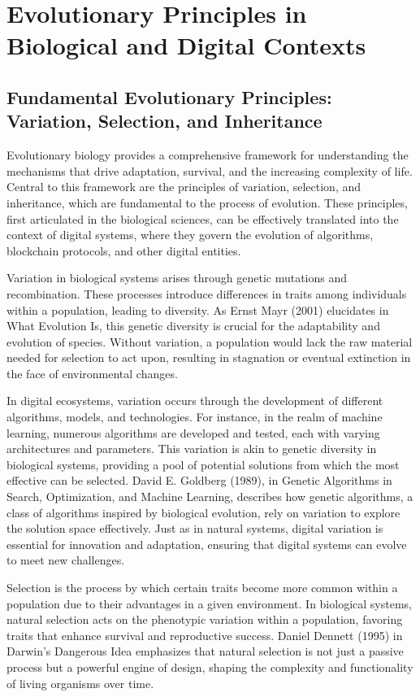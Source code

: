 \documentclass[12pt,twoside]{article}
\begin{document}
\section{Evolutionary Principles in Biological and Digital Contexts}

\subsection{Fundamental Evolutionary Principles: Variation, Selection, and Inheritance}

Evolutionary biology provides a comprehensive framework for understanding the mechanisms that drive adaptation, survival, and the increasing complexity of life. Central to this framework are the principles of variation, selection, and inheritance, which are fundamental to the process of evolution. These principles, first articulated in the biological sciences, can be effectively translated into the context of digital systems, where they govern the evolution of algorithms, blockchain protocols, and other digital entities.

Variation in biological systems arises through genetic mutations and recombination. These processes introduce differences in traits among individuals within a population, leading to diversity. As Ernst Mayr (2001) elucidates in What Evolution Is, this genetic diversity is crucial for the adaptability and evolution of species. Without variation, a population would lack the raw material needed for selection to act upon, resulting in stagnation or eventual extinction in the face of environmental changes.

In digital ecosystems, variation occurs through the development of different algorithms, models, and technologies. For instance, in the realm of machine learning, numerous algorithms are developed and tested, each with varying architectures and parameters. This variation is akin to genetic diversity in biological systems, providing a pool of potential solutions from which the most effective can be selected. David E. Goldberg (1989), in Genetic Algorithms in Search, Optimization, and Machine Learning, describes how genetic algorithms, a class of algorithms inspired by biological evolution, rely on variation to explore the solution space effectively. Just as in natural systems, digital variation is essential for innovation and adaptation, ensuring that digital systems can evolve to meet new challenges.

Selection is the process by which certain traits become more common within a population due to their advantages in a given environment. In biological systems, natural selection acts on the phenotypic variation within a population, favoring traits that enhance survival and reproductive success. Daniel Dennett (1995) in Darwin's Dangerous Idea emphasizes that natural selection is not just a passive process but a powerful engine of design, shaping the complexity and functionality of living organisms over time.
\end{document}
